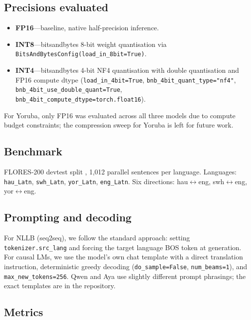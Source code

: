 \documentclass[11pt,a4paper]{article}
\begin{document}
\subsection{Precisions evaluated}

\begin{itemize}
\item \textbf{FP16}---baseline, native half-precision inference.
\item \textbf{INT8}---bitsandbytes 8-bit weight quantisation
      \cite{dettmers2022int8} via
      \texttt{BitsAndBytesConfig(load\_in\_8bit=True)}.
\item \textbf{INT4}---bitsandbytes 4-bit NF4 quantisation
      \cite{dettmers2023qlora} with double quantisation and FP16
      compute dtype (\texttt{load\_in\_4bit=True},
      \texttt{bnb\_4bit\_quant\_type="nf4"},
      \texttt{bnb\_4bit\_use\_double\_quant=True},
      \texttt{bnb\_4bit\_compute\_dtype=torch.float16}).
\end{itemize}

For Yoruba, only FP16 was evaluated across all three models due to
compute budget constraints; the compression sweep for Yoruba is left
for future work.

\subsection{Benchmark}

FLORES-200 devtest split \cite{nllb2022,goyal2022flores}, 1{,}012
parallel sentences per language. Languages: \texttt{hau\_Latn},
\texttt{swh\_Latn}, \texttt{yor\_Latn}, \texttt{eng\_Latn}. Six
directions: hau$\leftrightarrow$eng, swh$\leftrightarrow$eng,
yor$\leftrightarrow$eng.

\subsection{Prompting and decoding}

For NLLB (seq2seq), we follow the standard approach: setting
\texttt{tokenizer.src\_lang} and forcing the target language BOS token
at generation. For causal LMs, we use the model's own chat template
with a direct translation instruction, deterministic greedy decoding
(\texttt{do\_sample=False}, \texttt{num\_beams=1}), and
\texttt{max\_new\_tokens=256}. Qwen and Aya use slightly different
prompt phrasings; the exact templates are in the repository.

\subsection{Metrics}
\end{document}
